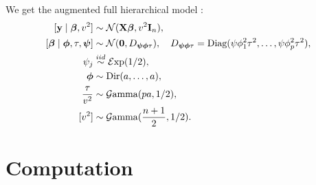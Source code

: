 \documentclass[10pt]{article}
\begin{document}
We get the augmented full hierarchical model :
\begin{align} \label{sq_dl_h}
[ \y \mid \bbeta, v^2 ] & \sim \NormRV(\X \bbeta, v^2 \I_n), \\
[\bbeta \mid \bphi, \tau , \bpsi ] & \sim \NormRV(\0, D_{\bpsi \bphi \tau}), \quad D_{\bpsi \bphi \tau} = \text{Diag}(\psi\phi_1^2\tau^2, \ldots, \psi\phi_p^2\tau^2), \\
\psi_j & \stackrel{iid}{\sim} \mathcal{E}\mathrm{xp}(1/2), \\
\bphi & \sim \text{\rm{Dir}}(a, \ldots ,a), \\
\frac{\tau}{v^2} & \sim \mathcal{G}\mathrm{amma}(pa , 1/2), \\
[v^2] & \sim \mathcal{G}\mathrm{amma}(\frac{n+1}{2} , 1/2).  
\end{align}



\section{Computation}\label{sec:comp}
\end{document}
